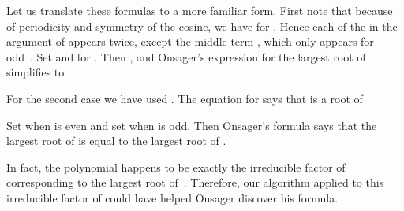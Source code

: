 \documentclass{sig-alternate}
\begin{document}
Let us translate these formulas to a more familiar form.
First note that because of periodicity and symmetry of the cosine,
we have  for . Hence each of the
 in the argument of  appears twice, except the
middle term , which only appears for odd~.
Set  and  for .
Then , and Onsager's expression for the
largest root of  simplifies to

For the second case we have used .
The equation for  says that  is a root of 

Set  when  is even and set 
when  is odd. Then Onsager's formula says that the largest root of  is equal
to the largest root of .

In fact, the polynomial  happens to be
exactly the irreducible factor of  corresponding to the largest root of~. Therefore,
our algorithm applied to this irreducible factor of  could have helped Onsager discover his formula.



\end{document}
